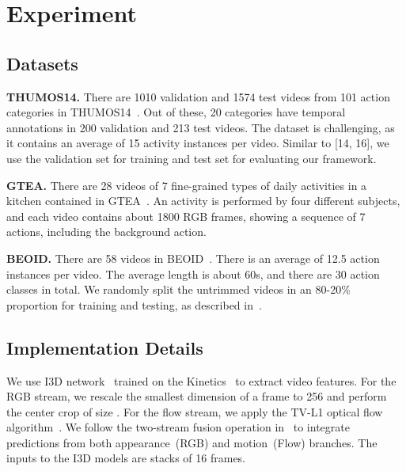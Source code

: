 \documentclass[runningheads]{llncs}
\begin{document}
	
	
	
	
	
	
	
	
\section{Experiment}
	
	\subsection{Datasets}
	
	
	\textbf{THUMOS14.}
	There are 1010 validation and 1574 test videos from 101 action categories in THUMOS14~\cite{idrees2017thumos}. Out of these, 20 categories have temporal annotations in 200 validation and 213 test videos. The dataset is challenging, as it contains an average of 15 activity instances per video. Similar to [14, 16], we use the validation set for training and test set for evaluating our framework. 
	
	


	\noindent\textbf{GTEA.}
	There are 28 videos of 7 fine-grained types of daily activities in a kitchen contained in GTEA~\cite{lei2018temporal}. An activity is performed by four different subjects, and each video contains about 1800 RGB frames, showing a sequence of 7 actions, including the background action. 
	
	\noindent\textbf{BEOID.}
	There are 58 videos in BEOID~\cite{damen2014you}. There is an average of 12.5 action instances per video. The average length is about 60s, and there are 30 action classes in total. 
	We randomly split the untrimmed videos in an 80-20\% proportion for training and testing, as described in~\cite{moltisanti2019action}. 
	
	
	\subsection{Implementation Details}
	We use I3D network~\cite{CarreiraI3D} trained on the Kinetics~\cite{carreira2017quo} to extract video features. For the RGB stream, we rescale the smallest dimension of a frame to 256 and perform the center crop of size . For the flow stream, we apply the TV-L1 optical flow algorithm~\cite{zach2007duality}. 
	We follow the two-stream fusion operation in~\cite{Narayan_2019_ICCV} to integrate predictions from both appearance~(RGB) and motion~(Flow) branches. 
	The inputs to the I3D models are stacks of 16 frames.
	
\end{document}
